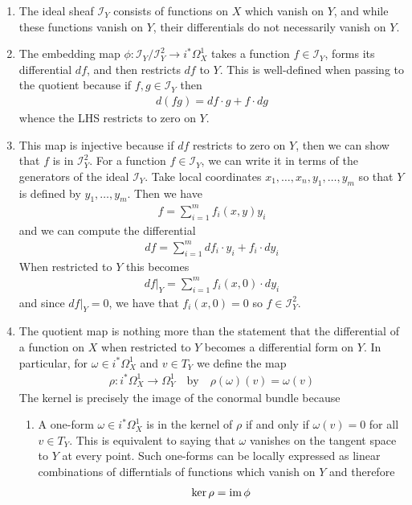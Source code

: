 \documentclass[12pt]{article}
\begin{document}
\begin{enumerate}
    \item The ideal sheaf $\mathcal{I}_Y$ consists of functions on $X$ which vanish on $Y$, and while these functions vanish on $Y$, their differentials do not necessarily vanish on $Y$. 
    \item The embedding map $\phi: \mathcal{I}_Y / \mathcal{I}_Y^2 \to i^*\Omega^1_X$ takes a function $f\in \mathcal{I}_Y$, forms its differential $df$, and then restricts $df$ to $Y$. This is well-defined when passing to the quotient because if $f,g\in \mathcal{I}_Y$ then
\begin{align*}
    d(fg) = df \cdot g + f \cdot dg
\end{align*} whence the LHS restricts to zero on $Y$.
    \item This map is injective because if $df$ restricts to zero on $Y$, then we can show that $f$ is in $\mathcal{I}_Y^2$. For a function $f\in \mathcal{I}_Y$, we can write it in terms of the generators of the ideal $\mathcal{I}_Y$. Take local coordinates $x_1,\ldots,x_n,y_1,\ldots,y_m$ so that $Y$ is defined by $y_1,\ldots,y_m$. Then we have \begin{align*}
        f = \sum_{i=1}^m f_i(x,y) y_i
    \end{align*}
    and we can compute the differential
    \begin{align*}
        df = \sum_{i=1}^m df_i \cdot y_i + f_i \cdot dy_i
    \end{align*} When restricted to $Y$ this becomes \begin{align*}
        df\vert_Y = \sum_{i=1}^m f_i(x,0) \cdot dy_i
    \end{align*} and since $df\vert_Y = 0$, we have that $f_i(x,0) = 0$ so $f\in \mathcal{I}_Y^2$.

    \item The quotient map is nothing more than the statement that the differential of a function on $X$ when restricted to $Y$ becomes a differential form on $Y$. In particular, for $\omega\in i^*\Omega^1_X$ and $v\in T_Y$ we define the map \begin{align*}
        \rho: i^*\Omega^1_X \to \Omega^1_Y \quad \text{by} \quad \rho(\omega)(v) = \omega(v)
        \end{align*} The kernel is precisely the image of the conormal bundle because \begin{enumerate}
            \item A one-form $\omega \in i^*\Omega^1_X$ is in the kernel of $\rho$ if and only if $\omega(v) = 0$ for all $v\in T_Y$. This is equivalent to saying that $\omega$ vanishes on the tangent space to $Y$ at every point. Such one-forms can be locally expressed as linear combinations of differntials of functions which vanish on $Y$ and therefore \begin{align*}
                \ker \rho = \operatorname{im} \phi
            \end{align*}
        \end{enumerate}
\end{enumerate}
\end{document}
